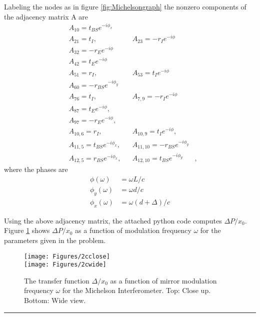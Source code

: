 \documentclass[11pt]{article}
\newcommand{\ep}{e^{-i\phi}}
\begin{document}
\begin{enumerate}
\begin{itemize}
Labeling the nodes as in figure \ref{fig:Michelsongraph} the nonzero components of the adjacency matrix A are 
\begin{align}
&A_{10}=t_{BS}e^{-i\phi_x} & \nonumber \\
&A_{21}=t_I, & &A_{23}=-r_Ie^{-i\phi}&  \nonumber \\
&A_{32}=-r_Ee^{-i\phi}& \nonumber  \\
&A_{42}=t_Ee^{-i\phi}& \nonumber \\
&A_{51}=r_I, & &A_{53}=t_I \ep& \nonumber \\
&A_{60}=-r_{BS}e^{-i\phi_y}& \nonumber \\
&A_{76}=t_I,& &A_{7,9}=-r_I\ep& \nonumber \\
&A_{87}=t_E\ep,& \nonumber \\
&A_{97}=-r_E\ep,& \nonumber \\
&A_{10,6}=r_I,& 
&A_{10,9}=t_I\ep,& \nonumber \\
&A_{11,5}=t_{BS}e^{-i\phi_x},&
&A_{11,10}=-r_{BS}e^{-i\phi_y}& \nonumber \\
&A_{12,5}=r_{BS}e^{-i\phi_x},&
&A_{12,10}=t_{BS}e^{-i\phi_y}&,
\end{align}
where the phases are
\begin{align}
\phi(\omega)&=\omega L/c \nonumber \\ 
\phi_y(\omega)&=\omega d/c \nonumber  \\
\phi_x(\omega) &=\omega(d+\Delta)/c
\end{align}

Using the above adjacency matrix, the attached python code computes $\Delta P/x_0$. Figure \ref{fig:2c} shows  $\Delta P/x_0$ as a function of modulation frequency $\omega$ for the parameters given in the problem.
\begin{figure}[h]
\texttt{[image: Figures/2cclose]}
\\
\texttt{[image: Figures/2cwide]}
\caption{The transfer function $\Delta /x_0$ as a function of mirror modulation frequency $\omega$ for the Michelson Interferometer. Top: Close up. Bottom: Wide view.
}
\label{fig:2c}
\end{figure}


\end{itemize}

\end{enumerate}

\bigskip
{\color{Sepia} \hrule}
\end{document}
